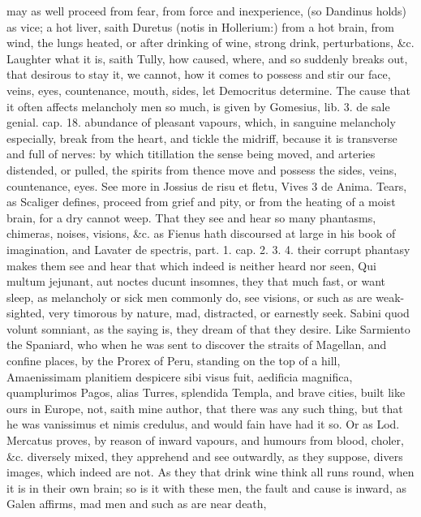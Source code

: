 {may as well proceed from fear, from force and inexperience, (so
Dandinus holds) as vice; a hot liver, saith Duretus (notis in
Hollerium:) from a hot brain, from wind, the lungs heated, or after
drinking of wine, strong drink, perturbations, \&c.
Laughter what it is, saith Tully, how caused, where, and so
suddenly breaks out, that desirous to stay it, we cannot, how it comes
to possess and stir our face, veins, eyes, countenance, mouth, sides,
let Democritus determine. The cause that it often affects melancholy
men so much, is given by Gomesius, lib. 3. de sale genial. cap. 18.
abundance of pleasant vapours, which, in sanguine melancholy
especially, break from the heart, and tickle the midriff, because
it is transverse and full of nerves: by which titillation the sense
being moved, and arteries distended, or pulled, the spirits from thence
move and possess the sides, veins, countenance, eyes. See more in
Jossius de risu et fletu, Vives 3 de Anima. Tears, as Scaliger defines,
proceed from grief and pity, or from the heating of a moist
brain, for a dry cannot weep.
That they see and hear so many phantasms, chimeras, noises, visions,
\&c. as Fienus hath discoursed at large in his book of imagination, and
 Lavater de spectris, part. 1. cap. 2. 3. 4. their corrupt
phantasy makes them see and hear that which indeed is neither heard nor
seen, Qui multum jejunant, aut noctes ducunt insomnes, they that much
fast, or want sleep, as melancholy or sick men commonly do, see
visions, or such as are weak-sighted, very timorous by nature, mad,
distracted, or earnestly seek. Sabini quod volunt somniant, as the
saying is, they dream of that they desire. Like Sarmiento the Spaniard,
who when he was sent to discover the straits of Magellan, and confine
places, by the Prorex of Peru, standing on the top of a hill,
Amaenissimam planitiem despicere sibi visus fuit, aedificia magnifica,
quamplurimos Pagos, alias Turres, splendida Templa, and brave cities,
built like ours in Europe, not, saith mine author, that there was
any such thing, but that he was vanissimus et nimis credulus, and would
fain have had it so. Or as Lod. Mercatus proves, by reason of
inward vapours, and humours from blood, choler, \&c. diversely mixed,
they apprehend and see outwardly, as they suppose, divers images, which
indeed are not. As they that drink wine think all runs round, when it
is in their own brain; so is it with these men, the fault and cause is
inward, as Galen affirms, mad men and such as are near death,
}
